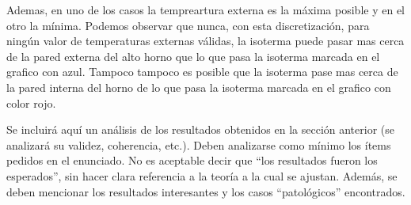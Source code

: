 	Ademas, en uno de los casos la tempreartura externa es la máxima posible y en el otro la mínima. Podemos observar que nunca, con esta discretización, para ningún valor de temperaturas externas válidas, la isoterma puede pasar mas cerca de la pared externa del alto horno que lo que pasa la isoterma marcada en el grafico con azul. Tampoco tampoco es posible que la isoterma pase mas cerca de la pared interna del horno de lo que pasa la isoterma marcada en el grafico con color rojo.


  {\color{Gray} Se incluirá aquí un análisis de los resultados obtenidos en la sección anterior (se analizará su validez, coherencia, etc.). Deben analizarse como mínimo los ítems pedidos en el enunciado. No es aceptable decir que ``los resultados fueron los esperados'', sin hacer clara referencia a la teoría a la cual se ajustan. Además, se deben mencionar los resultados interesantes y los casos ``patológicos'' encontrados.}
